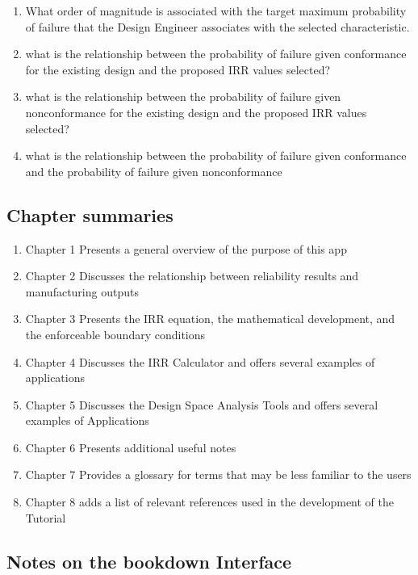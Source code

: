 \documentclass[
]{article}
\providecommand{\tightlist}{%
  \setlength{\itemsep}{0pt}\setlength{\parskip}{0pt}}
\begin{document}
\begin{enumerate}
\def\labelenumi{\arabic{enumi}.}
\tightlist
\item
  What order of magnitude is associated with the target maximum probability of failure that the Design Engineer associates with the selected characteristic.
\item
  what is the relationship between the probability of failure given conformance for the existing design and the proposed IRR values selected?
\item
  what is the relationship between the probability of failure given nonconformance for the existing design and the proposed IRR values selected?
\item
  what is the relationship between the probability of failure given conformance and the probability of failure given nonconformance
\end{enumerate}

\subsection{Chapter summaries}\label{chapter-summaries}

\begin{enumerate}
\def\labelenumi{\arabic{enumi}.}
\tightlist
\item
  Chapter 1 Presents a general overview of the purpose of this app
\item
  Chapter 2 Discusses the relationship between reliability results and manufacturing outputs
\item
  Chapter 3 Presents the IRR equation, the mathematical development, and the enforceable boundary conditions
\item
  Chapter 4 Discusses the IRR Calculator and offers several examples of applications
\item
  Chapter 5 Discusses the Design Space Analysis Tools and offers several examples of Applications
\item
  Chapter 6 Presents additional useful notes
\item
  Chapter 7 Provides a glossary for terms that may be less familiar to the users
\item
  Chapter 8 adds a list of relevant references used in the development of the Tutorial
\end{enumerate}

\subsection{Notes on the bookdown Interface}\label{notes-on-the-bookdown-interface}
\end{document}
